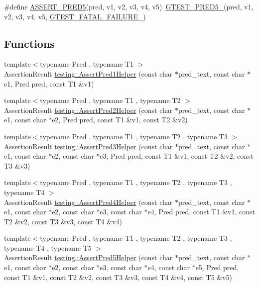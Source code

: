 \begin{DoxyCompactItemize}
\item 
\#define \mbox{\hyperlink{googletest-master_2googletest_2include_2gtest_2gtest__pred__impl_8h_af8e510af2b4a14d90eef66ace17d1c30}{A\+S\+S\+E\+R\+T\+\_\+\+P\+R\+E\+D5}}(pred,  v1,  v2,  v3,  v4,  v5)~\mbox{\hyperlink{_obj__test_2lib_2googletest-release-1_88_81_2googletest_2include_2gtest_2gtest__pred__impl_8h_a2c42692f7d910dc2fe57869883190e6c}{G\+T\+E\+S\+T\+\_\+\+P\+R\+E\+D5\+\_\+}}(pred, v1, v2, v3, v4, v5, \mbox{\hyperlink{_obj__test_2lib_2googletest-release-1_88_81_2googletest_2include_2gtest_2internal_2gtest-internal_8h_a0f9a4c3ea82cc7bf4478eaffdc168358}{G\+T\+E\+S\+T\+\_\+\+F\+A\+T\+A\+L\+\_\+\+F\+A\+I\+L\+U\+R\+E\+\_\+}})
\end{DoxyCompactItemize}
\subsection*{Functions}
\begin{DoxyCompactItemize}
\item 
{\footnotesize template$<$typename Pred , typename T1 $>$ }\\Assertion\+Result \mbox{\hyperlink{namespacetesting_a7f73180474723be6e92185d6fa9e7c9f}{testing\+::\+Assert\+Pred1\+Helper}} (const char $\ast$pred\+\_\+text, const char $\ast$e1, Pred pred, const T1 \&v1)
\item 
{\footnotesize template$<$typename Pred , typename T1 , typename T2 $>$ }\\Assertion\+Result \mbox{\hyperlink{namespacetesting_aa6587938029dd8733ecb885068f08247}{testing\+::\+Assert\+Pred2\+Helper}} (const char $\ast$pred\+\_\+text, const char $\ast$e1, const char $\ast$e2, Pred pred, const T1 \&v1, const T2 \&v2)
\item 
{\footnotesize template$<$typename Pred , typename T1 , typename T2 , typename T3 $>$ }\\Assertion\+Result \mbox{\hyperlink{namespacetesting_ac92dcbd00a0ffb2913e65d286e321a22}{testing\+::\+Assert\+Pred3\+Helper}} (const char $\ast$pred\+\_\+text, const char $\ast$e1, const char $\ast$e2, const char $\ast$e3, Pred pred, const T1 \&v1, const T2 \&v2, const T3 \&v3)
\item 
{\footnotesize template$<$typename Pred , typename T1 , typename T2 , typename T3 , typename T4 $>$ }\\Assertion\+Result \mbox{\hyperlink{namespacetesting_ae90c778d69db4682e8fd8baaa0a9f9cd}{testing\+::\+Assert\+Pred4\+Helper}} (const char $\ast$pred\+\_\+text, const char $\ast$e1, const char $\ast$e2, const char $\ast$e3, const char $\ast$e4, Pred pred, const T1 \&v1, const T2 \&v2, const T3 \&v3, const T4 \&v4)
\item 
{\footnotesize template$<$typename Pred , typename T1 , typename T2 , typename T3 , typename T4 , typename T5 $>$ }\\Assertion\+Result \mbox{\hyperlink{namespacetesting_addcf52b273ce17269cbf4956cfe600a6}{testing\+::\+Assert\+Pred5\+Helper}} (const char $\ast$pred\+\_\+text, const char $\ast$e1, const char $\ast$e2, const char $\ast$e3, const char $\ast$e4, const char $\ast$e5, Pred pred, const T1 \&v1, const T2 \&v2, const T3 \&v3, const T4 \&v4, const T5 \&v5)
\end{DoxyCompactItemize}


